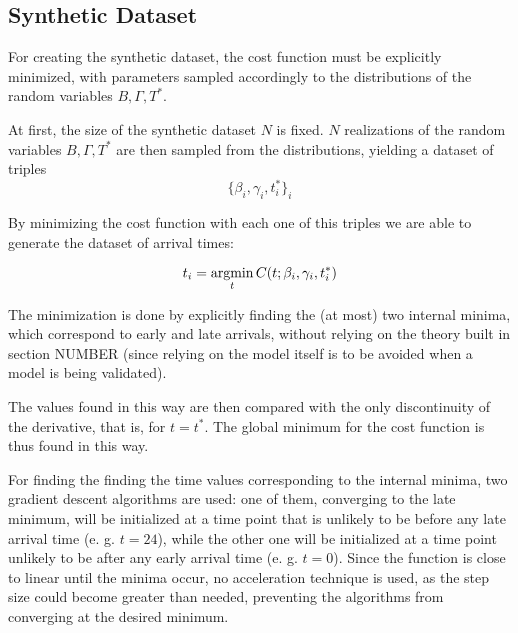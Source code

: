 \subsection{Synthetic Dataset}

For creating the synthetic dataset,
the cost function must be explicitly minimized,
with parameters sampled accordingly to the distributions of the random variables \(B, \Gamma, T^*\).

At first, the size of the synthetic dataset \(N\) is fixed.
\(N\) realizations of the random variables \(B, \Gamma, T^*\) are then sampled from the distributions,
yielding a dataset of triples
\begin{equation*}
  \{\beta_i, \gamma_i, t^*_i\}_i
\end{equation*}

By minimizing the cost function with each one of this triples we are able to generate the dataset of arrival times:

\begin{equation*}
  t_i = \operatorname*{argmin}_t C(t; \beta_i, \gamma_i, t^*_i)
\end{equation*}

The minimization is done by explicitly finding the (at most) two internal minima,
which correspond to early and late arrivals,
without relying on the theory built in section NUMBER
(since relying on the model itself is to be avoided when a model is being validated).

The values found in this way are then compared with the only discontinuity of the derivative,
that is, for \(t = t^*\).
The global minimum for the cost function is thus found in this way.

For finding the finding the time values corresponding to the internal minima,
two gradient descent algorithms are used:
one of them, converging to the late minimum,
will be initialized at a time point that is unlikely to be before any late arrival time (e. g. \(t = 24\)),
while the other one will be initialized at a time point unlikely to be after any early arrival time (e. g. \(t = 0\)).
Since the function is close to linear until the minima occur,
no acceleration technique is used,
as the step size could become greater than needed,
preventing the algorithms from converging at the desired minimum.


